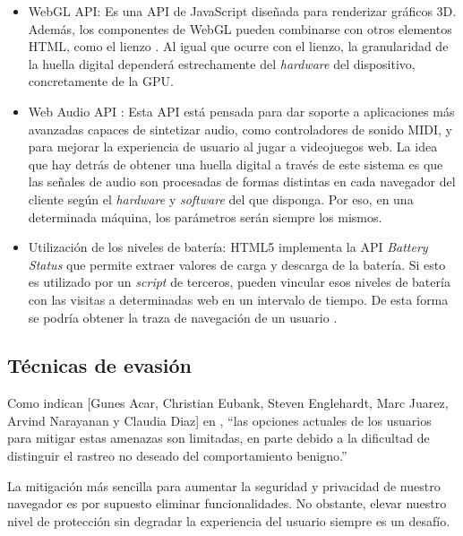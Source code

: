 \begin{itemize}
	\item WebGL API: Es una API de JavaScript diseñada para renderizar gráficos 3D. Además, los componentes de WebGL pueden combinarse con otros elementos HTML, como el lienzo \cite{canvas_paper}. Al igual que ocurre con el lienzo, la granularidad de la huella digital dependerá estrechamente del \textit{hardware} del dispositivo, concretamente de la GPU. \par 
	
	\item Web Audio API \cite{audio_w3c}: Esta API está pensada para dar soporte a aplicaciones más avanzadas capaces de sintetizar audio, como controladores de sonido MIDI, y para mejorar la experiencia de usuario al jugar a videojuegos web. La idea que hay detrás de obtener una huella digital a través de este sistema es que las señales de audio son procesadas de formas distintas en cada navegador del cliente según el \textit{hardware} y \textit{software} del que disponga. Por eso, en una determinada máquina, los parámetros serán siempre los mismos. \par 
	
	\item Utilización de los niveles de batería: HTML5 implementa la API \textit{Battery Status} que permite extraer valores de carga y descarga de la batería. Si esto es utilizado por un \textit{script} de terceros, pueden vincular esos niveles de batería con las visitas a determinadas web en un intervalo de tiempo. De esta forma se podría obtener la traza de navegación de un usuario \cite{battery_paper}. \par 
	
\end{itemize}

\subsection{Técnicas de evasión}
Como indican [Gunes Acar, Christian Eubank, Steven Englehardt, Marc Juarez, Arvind Narayanan y Claudia Diaz] en \cite{never_forget_paper}, {``las opciones actuales de los usuarios para mitigar estas amenazas son limitadas, en parte debido a la dificultad de distinguir el rastreo no deseado del comportamiento benigno.''} \par 

La mitigación más sencilla para aumentar la seguridad y privacidad de nuestro navegador es por supuesto eliminar funcionalidades. No obstante, elevar nuestro nivel de protección sin degradar la experiencia del usuario siempre es un desafío. \par 

